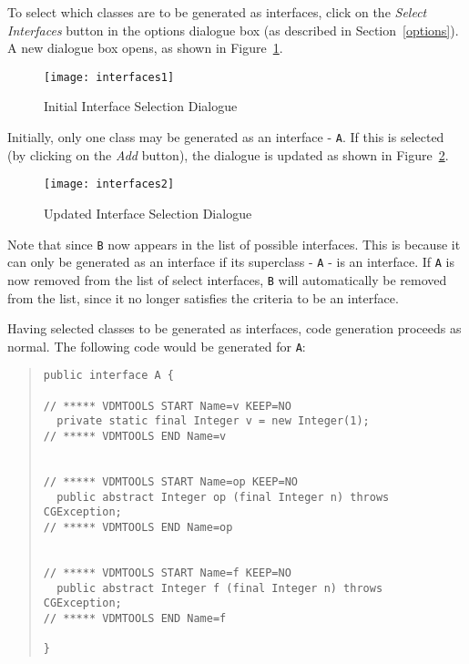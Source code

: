 \documentclass[\pformat,11pt]{article}
\begin{document}
To select which classes are to be generated as interfaces, click on
the \textit{Select Interfaces} button in the options dialogue box (as
described in Section~\ref{options}). A new dialogue box opens, as
shown in Figure~\ref{fig:interfaces1}.

\begin{figure}
\begin{center}
\texttt{[image: interfaces1]}
\end{center}
\caption{Initial Interface Selection Dialogue}\label{fig:interfaces1}
\end{figure}

Initially, only one class may be generated as an interface -
\texttt{A}. If this is selected (by clicking on the \textit{Add}
button), the dialogue is updated as shown in Figure~\ref{fig:interfaces2}.

\begin{figure}
\begin{center}
\texttt{[image: interfaces2]}
\end{center}
\caption{Updated Interface Selection Dialogue}\label{fig:interfaces2}
\end{figure}

Note that since \texttt{B} now appears in the list of possible
interfaces. This is because it can only be generated as an interface
if its superclass - \texttt{A} - is an interface. If \texttt{A} is now
removed from the list of select interfaces, \texttt{B} will
automatically be removed from the list, since it no longer satisfies
the criteria to be an interface.

Having selected classes to be generated as interfaces, code generation
proceeds as normal. The following code would be generated for
\texttt{A}:
\begin{quote}
\begin{verbatim}
public interface A {
 
// ***** VDMTOOLS START Name=v KEEP=NO
  private static final Integer v = new Integer(1);
// ***** VDMTOOLS END Name=v
 
 
// ***** VDMTOOLS START Name=op KEEP=NO
  public abstract Integer op (final Integer n) throws CGException;
// ***** VDMTOOLS END Name=op
 
 
// ***** VDMTOOLS START Name=f KEEP=NO
  public abstract Integer f (final Integer n) throws CGException;
// ***** VDMTOOLS END Name=f
 
} 
\end{verbatim}
\end{quote}
\end{document}
